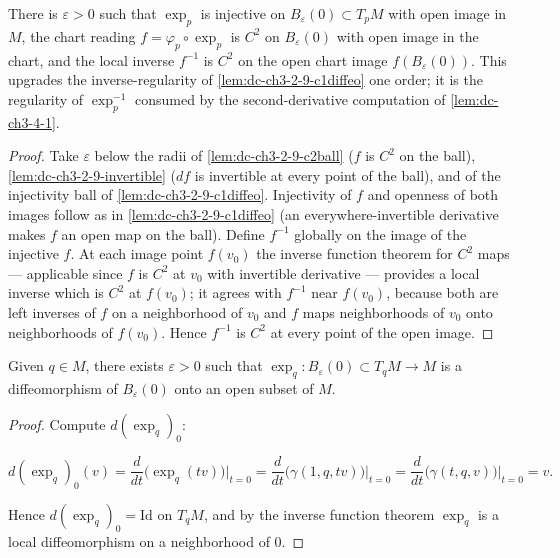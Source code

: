 \begin{lemma}
  \label{lem:dc-ch3-2-9-c2diffeo}
  \leanok
  There is $\varepsilon > 0$ such that $\exp_p$ is injective on
  $B_\varepsilon(0) \subset T_pM$ with open image in $M$, the chart reading
  $f = \varphi_p \circ \exp_p$ is $C^2$ on $B_\varepsilon(0)$ with open image
  in the chart, and the local inverse $f^{-1}$ is $C^2$ on the open chart
  image $f(B_\varepsilon(0))$. This upgrades the inverse-regularity of
  \cref{lem:dc-ch3-2-9-c1diffeo} one order; it is the regularity of
  $\exp_p^{-1}$ consumed by the second-derivative computation of
  \cref{lem:dc-ch3-4-1}.
\end{lemma}
\begin{proof}
  \sketch
  \leanok
  Take $\varepsilon$ below the radii of \cref{lem:dc-ch3-2-9-c2ball} ($f$ is
  $C^2$ on the ball), \cref{lem:dc-ch3-2-9-invertible} ($df$ is invertible at
  every point of the ball), and of the injectivity ball of
  \cref{lem:dc-ch3-2-9-c1diffeo}. Injectivity of $f$ and openness of both
  images follow as in \cref{lem:dc-ch3-2-9-c1diffeo} (an everywhere-invertible
  derivative makes $f$ an open map on the ball). Define $f^{-1}$ globally on
  the image of the injective $f$. At each image point $f(v_0)$ the inverse
  function theorem for $C^2$ maps — applicable since $f$ is $C^2$ at $v_0$
  with invertible derivative — provides a local inverse which is $C^2$ at
  $f(v_0)$; it agrees with $f^{-1}$ near $f(v_0)$, because both are left
  inverses of $f$ on a neighborhood of $v_0$ and $f$ maps neighborhoods of
  $v_0$ onto neighborhoods of $f(v_0)$. Hence $f^{-1}$ is $C^2$ at every
  point of the open image.
\end{proof}

\begin{proposition}
  \label{prop:dc-ch3-2-9}
  \leanok
  \notready
  Given $q\in M$, there exists $\varepsilon>0$ such that
  $\exp_q:B_\varepsilon(0)\subset T_qM\to M$ is a diffeomorphism of
  $B_\varepsilon(0)$ onto an open subset of $M$.
\end{proposition}
\begin{proof}
  \sketch
  Compute $d(\exp_q)_0$:
  
  $$
  d(\exp_q)_0(v)=\frac{d}{dt}\big(\exp_q(tv)\big)\Big|_{t=0}=\frac{d}{dt}\big(\gamma(1,q,tv)\big)\Big|_{t=0}=\frac{d}{dt}\big(\gamma(t,q,v)\big)\Big|_{t=0}=v.
  $$
  
  Hence $d(\exp_q)_0=\mathrm{Id}$ on $T_qM$, and by the inverse function theorem
  $\exp_q$ is a local diffeomorphism on a neighborhood of $0$.
\end{proof}

